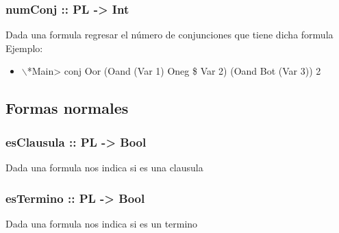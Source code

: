 \documentclass[11pt]{article}
\begin{document}
\subsubsection{numConj :: PL -> Int}
\label{sec:org31745e1}
Dada una formula regresar el número de conjunciones que tiene dicha formula
Ejemplo:
\begin{itemize}
\item $\backslash$*Main> conj Oor (Oand (Var 1) Oneg \$ Var 2) (Oand Bot (Var 3))
2
\end{itemize}
\subsection{Formas normales}
\label{sec:org6750248}
\subsubsection{esClausula :: PL -> Bool}
\label{sec:org2a6c6ff}
Dada una formula nos indica si es una clausula
\subsubsection{esTermino :: PL -> Bool}
\label{sec:org22f6694}
Dada una formula nos indica si es un termino
\end{document}
